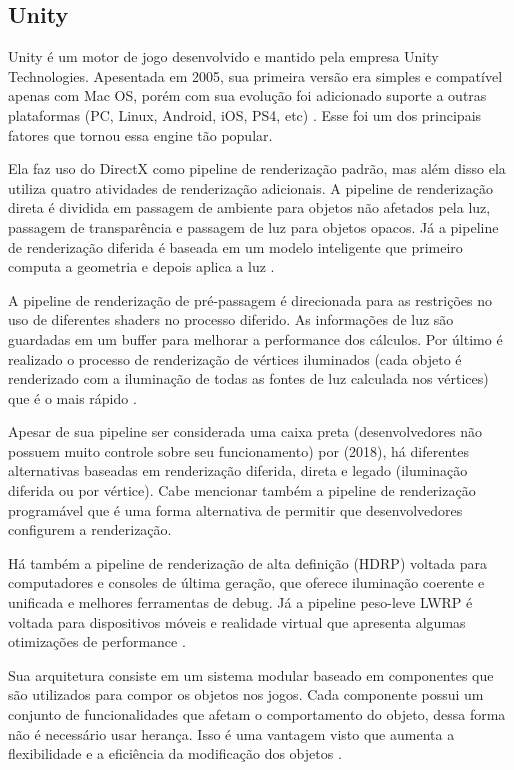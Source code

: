 \subsection{Unity}
\label{sec:unity}

Unity é um motor de jogo desenvolvido e mantido pela empresa Unity Technologies. Apesentada em 2005, sua primeira versão era simples e compatível apenas com Mac OS, porém com sua evolução foi adicionado suporte a outras plataformas (PC, Linux, Android, iOS, PS4, etc) \cite{compStudyGE}. Esse foi um dos principais fatores que tornou essa engine tão popular.

Ela faz uso do DirectX como pipeline de renderização padrão, mas além disso ela utiliza quatro atividades de renderização adicionais. A pipeline de renderização direta é dividida em passagem de ambiente para objetos não afetados pela luz, passagem de transparência e passagem de luz para objetos opacos. Já a pipeline de renderização diferida é baseada em um modelo inteligente que primeiro computa a geometria e depois aplica a luz \cite{simon2015unity}.

A pipeline de renderização de pré-passagem é direcionada para as restrições no uso de diferentes shaders no processo diferido. As informações de luz são guardadas em um buffer para melhorar a performance dos cálculos. Por último é realizado o processo de renderização de vértices iluminados (cada objeto é renderizado com a iluminação de todas as fontes de luz calculada nos vértices) que é o mais rápido \cite{simon2015unity}. 

Apesar de sua pipeline ser considerada uma caixa preta (desenvolvedores não possuem muito controle sobre seu funcionamento) por  (2018), há diferentes alternativas baseadas em renderização diferida, direta e legado (iluminação diferida ou por vértice). Cabe mencionar também a pipeline de renderização programável que é uma forma alternativa de permitir que desenvolvedores configurem a renderização.

Há também a pipeline de renderização de alta definição (\acrshort{HDRP}) voltada para computadores e consoles de última geração, que oferece iluminação coerente e unificada e melhores ferramentas de debug. Já a pipeline peso-leve \acrshort{LWRP} é voltada para dispositivos móveis e realidade virtual que apresenta algumas otimizações de performance \cite{hasu2018modern}.

Sua arquitetura consiste em um sistema modular baseado em componentes que são utilizados para compor os objetos nos jogos. Cada componente possui um conjunto de funcionalidades que afetam o comportamento do objeto, dessa forma não é necessário usar herança. Isso é uma vantagem visto que aumenta a flexibilidade e a eficiência da modificação dos objetos \cite{compStudyGE}.

